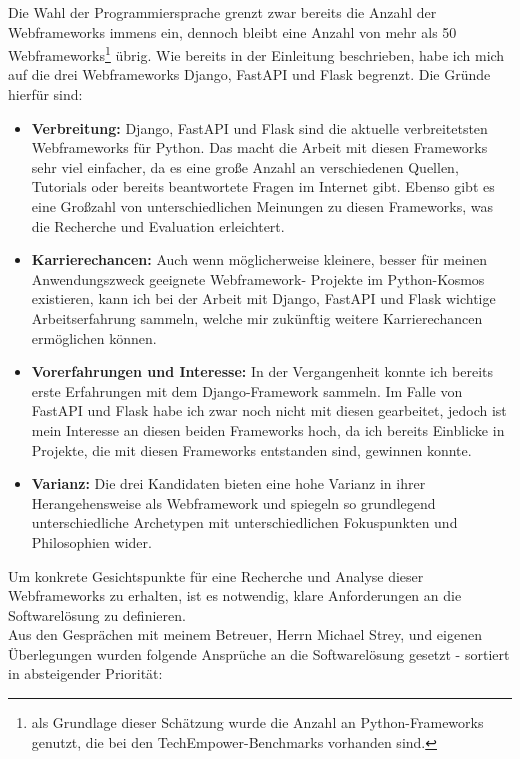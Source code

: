 \documentclass[letterpaper,11pt,leqno]{article}
\begin{document}
Die Wahl der Programmiersprache grenzt zwar bereits die Anzahl der Webframeworks immens ein, dennoch
bleibt eine Anzahl von mehr als 50 Webframeworks\footnote{als Grundlage dieser Schätzung wurde die
Anzahl an Python-Frameworks genutzt, die bei den TechEmpower-Benchmarks vorhanden sind.} übrig. Wie
bereits in der Einleitung beschrieben, habe ich mich auf die drei Webframeworks Django, FastAPI und
Flask begrenzt. Die Gründe hierfür sind:
\begin{itemize}
	\item\textbf{Verbreitung:} Django, FastAPI und Flask sind die aktuelle verbreitetsten
	Webframeworks für Python. Das macht die Arbeit mit diesen Frameworks sehr viel einfacher, da es
	eine große Anzahl an verschiedenen Quellen, Tutorials oder bereits beantwortete Fragen im
	Internet gibt. Ebenso gibt es eine Großzahl von unterschiedlichen Meinungen zu diesen
	Frameworks, was die Recherche und Evaluation erleichtert.
	\item\textbf{Karrierechancen:} Auch wenn möglicherweise kleinere, besser für meinen
	Anwendungszweck geeignete Webframework- Projekte im Python-Kosmos existieren, kann ich bei der
	Arbeit mit Django, FastAPI und Flask wichtige Arbeitserfahrung sammeln, welche mir zukünftig
	weitere Karrierechancen ermöglichen können.
	\item\textbf{Vorerfahrungen und Interesse:} In der Vergangenheit konnte ich bereits erste
	Erfahrungen mit dem Django-Framework sammeln. Im Falle von FastAPI und Flask habe ich zwar noch
	nicht mit diesen gearbeitet, jedoch ist mein Interesse an diesen beiden Frameworks hoch, da ich
	bereits Einblicke in Projekte, die mit diesen Frameworks entstanden sind, gewinnen konnte.
	\item\textbf{Varianz:} Die drei Kandidaten bieten eine hohe Varianz in ihrer Herangehensweise
	als Webframework und spiegeln so grundlegend unterschiedliche Archetypen mit unterschiedlichen
	Fokuspunkten und Philosophien wider.
\end{itemize}
Um konkrete Gesichtspunkte für eine Recherche und Analyse dieser Webframeworks zu erhalten, ist es
notwendig, klare Anforderungen an die Softwarelösung zu definieren.\\Aus den Gesprächen mit meinem
Betreuer, Herrn Michael Strey, und eigenen Überlegungen wurden folgende Ansprüche an die
Softwarelösung gesetzt - sortiert in absteigender Priorität:
\end{document}
